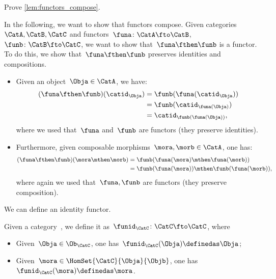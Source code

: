 \begin{exercise}
    Prove \cref{lem:functors_compose}.
\end{exercise}
\begin{solution}
    In the following, we want to show that functors compose.
    Given categories~$\CatA,\CatB,\CatC$ and functors~$\funa\colon \CatA\fto \CatB$,~$\funb \colon \CatB\fto \CatC$, we want to show that~$\funa\fthen\funb$ is a functor.
    To do this, we show that~$\funa\fthen\funb$ preserves identities and compositions.
    \begin{itemize}
        \item Given an object~$\Obja\in \CatA$, we have:
              \begin{equation*}
                  \begin{aligned}
                      (\funa\fthen\funb)(\catid_\Obja)
                       & =\funb(\funa(\catid_\Obja)) \\
                       & =\funb(\catid_{\funa(\Obja)}) \\
                       & =\catid_{\funb(\funa(\Obja))},
                  \end{aligned}
              \end{equation*}
              where we used that~$\funa$ and~$\funb$ are functors (they preserve identities).
        \item Furthermore, given composable morphisms~$\mora,\morb\in \CatA$, one has:
              \begin{equation*}
                  \begin{aligned}
                      (\funa\fthen\funb)(\mora\mthen\morb)
                       & =\funb(\funa(\mora)\mthen \funa(\morb)) \\
                       & =\funb(\funa(\mora))\mthen \funb(\funa(\morb)),
                  \end{aligned}
              \end{equation*}
              where again we used that~$\funa,\funb$ are functors (they preserve composition).
    \end{itemize}
\end{solution}

We can define an identity functor.

\begin{ctdefinition}
    \label{def:identity_functor}
    Given a category~\CatC, we define it as~$\funid_\CatC\colon \CatC \fto \CatC$, where
    \begin{itemize}
        \item Given~$\Obja\in \Ob_\CatC$, one has~$\funid_\CatC(\Obja)\definedas \Obja$;
        \item Given~$\mora \in \HomSet{\CatC}{\Obja}{\Objb}$, one has~$\funid_\CatC(\mora)\definedas \mora$.
    \end{itemize}
\end{ctdefinition}

